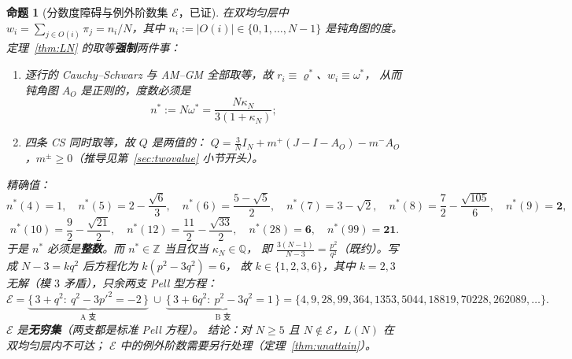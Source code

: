 \documentclass[UTF8,11pt]{ctexart}
\newtheorem{proposition}[theorem]{命题}
\theoremstyle{definition}
\newcommand{\Q}{\mathbb{Q}}
\newcommand{\Z}{\mathbb{Z}}
\begin{document}
\begin{proposition}[分数度障碍与例外阶数集 $\mathcal E$，已证]\label{prop:fracdeg}
在双均匀层中 $w_i=\sum_{j\in O(i)}\pi_j=n_i/N$，其中 $n_i:=|O(i)|\in\{0,1,\dots,N-1\}$ 是钝角图的度。
定理~\ref{thm:LN} 的取等\textbf{强制}两件事：
\begin{enumerate}[label=(\roman*),leftmargin=2.6em]
\item 逐行的 Cauchy--Schwarz 与 AM--GM 全部取等，故 $r_i\equiv\varrho^*$、$w_i\equiv\omega^*$，
从而钝角图 $A_O$ 是\emph{正则}的，度数必须是
\begin{equation}\label{eq:nstar}
n^*:=N\omega^*=\frac{N\kappa_N}{3(1+\kappa_N)};
\end{equation}
\item 四条 CS 同时取等，故 $Q$ 是\emph{两值}的：
$Q=\frac3NI_N+m^+(J-I-A_O)-m^-A_O$，$m^\pm\ge0$（推导见第~\ref{sec:twovalue} 小节开头）。
\end{enumerate}
精确值：
\[
n^*(4)=1,\quad n^*(5)=2-\frac{\sqrt6}3,\quad n^*(6)=\frac{5-\sqrt5}2,\quad
n^*(7)=3-\sqrt2,\quad n^*(8)=\frac72-\frac{\sqrt{105}}6,\quad n^*(9)=\mathbf{2},
\]
\[
n^*(10)=\frac92-\frac{\sqrt{21}}2,\quad n^*(12)=\frac{11}2-\frac{\sqrt{33}}2,\quad
n^*(28)=\mathbf{6},\quad n^*(99)=\mathbf{21}.
\]
于是 $n^*$ 必须是\textbf{整数}。而 $n^*\in\Z$ 当且仅当 $\kappa_N\in\Q$，
即 $\frac{3(N-1)}{N-3}=\frac{p^2}{q^2}$（既约）。写成 $N-3=kq^2$ 后方程化为 $k(p^2-3q^2)=6$，
故 $k\in\{1,2,3,6\}$，其中 $k=2,3$ 无解（模 $3$ 矛盾），只余两支 Pell 型方程：
\begin{equation}\label{eq:pell}
\mathcal E=\underbrace{\{\,3+q^2:\ q^2-3p'^2=-2\,\}}_{\text{A 支}}\ \cup\
\underbrace{\{\,3+6q^2:\ p^2-3q^2=1\,\}}_{\text{B 支}}
=\{4,9,28,99,364,1353,5044,18819,70228,262089,\dots\}.
\end{equation}
$\mathcal E$ 是\textbf{无穷集}（两支都是标准 Pell 方程）。
\emph{结论}：对 $N\ge5$ 且 $N\notin\mathcal E$，$L(N)$ 在双均匀层内不可达；
$\mathcal E$ 中的例外阶数需要另行处理（定理~\ref{thm:unattain}）。
\end{proposition}
\end{document}
